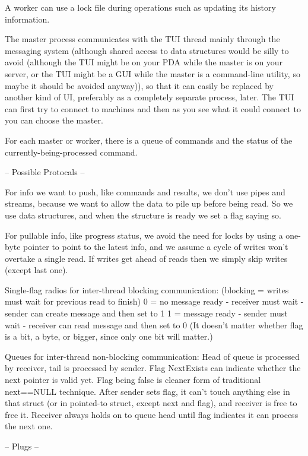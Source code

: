 \documentclass{book}
\begin{document}
A worker can use a lock file during operations such as updating its history information.

The master process communicates with the TUI thread mainly through the messaging system (although shared access to data structures would be silly to avoid (although the TUI might be on your PDA while the master is on your server, or the TUI might be a GUI while the master is a command-line utility, so maybe it should be avoided anyway)), so that it can easily be replaced by another kind of UI, preferably as a completely separate process, later.  The TUI can first try to connect to machines and then as you see what it could connect to you can choose the master.

For each master or worker, there is a queue of commands and the status of the currently-being-processed command.


-- Possible Protocals --

For info we want to push, like commands and results, we don't use pipes and streams, because we want to allow the data to pile up before being read.  So we use data structures, and when the structure is ready we set a flag saying so.

For pullable info, like progress status, we avoid the need for locks by using a one-byte pointer to point to the latest info, and we assume a cycle of writes won't overtake a single read.  If writes get ahead of reads then we simply skip writes (except last one).

Single-flag radios for inter-thread blocking communication: (blocking = writes must wait for previous read to finish)
0 = no message ready - receiver must wait - sender can create message and then set to 1
1 = message ready - sender must wait - receiver can read message and then set to 0
(It doesn't matter whether flag is a bit, a byte, or bigger, since only one bit will matter.)

Queues for inter-thread non-blocking communication:
Head of queue is processed by receiver, tail is processed by sender.  Flag NextExists can indicate whether the next pointer is valid yet.  Flag being false is cleaner form of traditional next==NULL technique.  After sender sets flag, it can't touch anything else in that struct (or in pointed-to struct, except next and flag), and receiver is free to free it.  Receiver always holds on to queue head until flag indicates it can process the next one.


-- Plugs --
\end{document}

